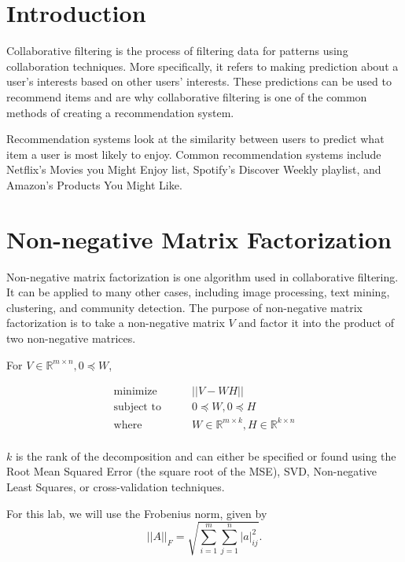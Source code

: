 

\section*{Introduction}
Collaborative filtering is the process of filtering data for patterns using collaboration techniques.
More specifically, it refers to making prediction about a user's interests based on other users' interests.
These predictions can be used to recommend items and are why collaborative filtering is one of the common methods of creating a recommendation system.

Recommendation systems look at the similarity between users to predict what item a user is most likely to enjoy.
Common recommendation systems include Netflix's Movies you Might Enjoy list, Spotify's Discover Weekly playlist, and Amazon's Products You Might Like.  


\section*{Non-negative Matrix Factorization}
Non-negative matrix factorization is one algorithm used in collaborative filtering.
It can be applied to many other cases, including image processing, text mining, clustering, and community detection.
The purpose of non-negative matrix factorization is to take a non-negative matrix $V$ and factor it into the product of two non-negative matrices. 

For $V\in\mathbb{R}^{m\times n}, 0\preceq W$,


\begin{align*}
\text{minimize}\qquad & ||V-WH|| \\
\text{subject to}\qquad &  0\preceq W, 0\preceq H\\
\text{where}\qquad & W\in\mathbb{R}^{m\times k}, H\in\mathbb{R}^{k\times n}\\
\end{align*}


$k$ is the rank of the decomposition and can either be specified or found using the Root Mean Squared Error (the square root of the MSE), SVD, Non-negative Least Squares, or cross-validation techniques.

For this lab, we will use the Frobenius norm, given by 
\[
||A||_{F} = \sqrt{\sum_{i=1}^{m}\sum_{j=1}^{n} |a|_{ij}^{2}}.
\]

